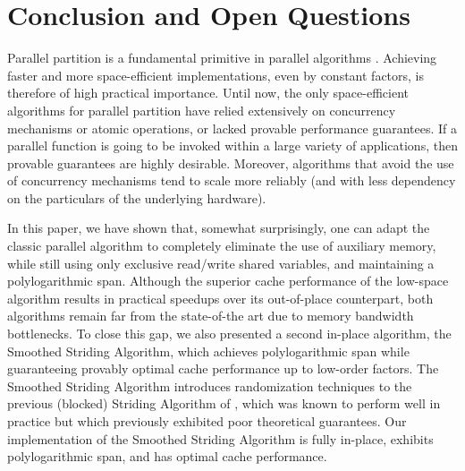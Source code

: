 \documentclass[twoside,leqno,twocolumn]{article}
\begin{document}


\clearpage

\appendix

\section{Conclusion and Open Questions}\label{sec:open}

Parallel partition is a fundamental primitive in parallel algorithms
\cite{Blelloch96,AcarBl16}. Achieving faster and more space-efficient
implementations, even by constant factors, is therefore of high
practical importance. Until now, the only space-efficient algorithms
for parallel partition have relied extensively on concurrency
mechanisms or atomic operations, or lacked provable performance
guarantees. If a parallel function is going to be invoked within a large
variety of applications, then provable guarantees are highly
desirable. Moreover, algorithms that avoid the use of concurrency
mechanisms tend to scale more reliably (and with less dependency on
the particulars of the underlying hardware).

In this paper, we have shown that, somewhat surprisingly, one can
adapt the classic parallel algorithm to completely eliminate the use
of auxiliary memory, while still using only exclusive read/write
shared variables, and maintaining a polylogarithmic span. Although the
superior cache performance of the low-space algorithm results in
practical speedups over its out-of-place counterpart, both algorithms
remain far from the state-of-the art due to memory bandwidth bottlenecks. To close this gap, we also
presented a second in-place algorithm, the Smoothed Striding
Algorithm, which achieves polylogarithmic span while guaranteeing
provably optimal cache performance up to low-order factors. The
Smoothed Striding Algorithm introduces randomization techniques to the
previous (blocked) Striding Algorithm of \cite{Frias08, FrancisPa92},
which was known to perform well in practice but which previously
exhibited poor theoretical guarantees. Our implementation of the
Smoothed Striding Algorithm is fully in-place, exhibits
polylogarithmic span, and has optimal cache performance.
\end{document}
